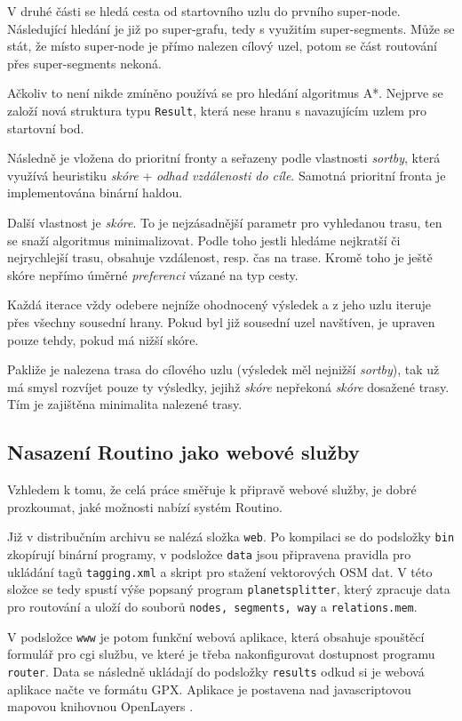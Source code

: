 \documentclass[thesis=B,czech]{FITthesis}[2012/06/26]
\begin{document}
V druhé části se hledá cesta od startovního uzlu do prvního super-node. Následující hledání je již po super-grafu, tedy s využitím super-segments.
Může se stát, že místo super-node je přímo nalezen cílový uzel, potom se část routování přes super-segments nekoná.

Ačkoliv to není nikde zmíněno používá se pro hledání algoritmus A*. Nejprve se založí nová struktura typu \verb|Result|, která nese hranu s navazujícím uzlem pro startovní bod.

Následně je vložena do prioritní fronty a seřazeny podle vlastnosti \emph{sortby}, která využívá heuristiku \emph{skóre} + \emph{odhad vzdálenosti do cíle}. Samotná prioritní fronta je implementována binární haldou.

Další vlastnost je \emph{skóre}. To je nejzásadnější parametr pro vyhledanou trasu, ten se snaží algoritmus minimalizovat. Podle toho jestli hledáme nejkratší či nejrychlejší trasu, obsahuje vzdálenost, resp. čas na trase. Kromě toho je ještě skóre nepřímo úměrné \emph{preferenci} vázané na typ cesty.

Každá iterace vždy odebere nejníže ohodnocený výsledek a z jeho uzlu iteruje přes všechny sousední hrany. Pokud byl již sousední uzel navštíven, je upraven pouze tehdy, pokud má nižší skóre.

Pakliže je nalezena trasa do cílového uzlu (výsledek měl nejnižší \emph{sortby}), tak už má smysl rozvíjet pouze ty výsledky, jejihž \emph{skóre} nepřekoná \emph{skóre} dosažené trasy. Tím je zajištěna minimalita nalezené trasy.

\subsection{Nasazení Routino jako webové služby}
Vzhledem k tomu, že celá práce směřuje k připravě webové služby, je dobré prozkoumat, jaké možnosti nabízí systém Routino. 

Již v distribučním archivu se nalézá složka \verb|web|. Po kompilaci se do podsložky \verb|bin| zkopírují binární programy, v podsložce \verb|data| jsou připravena pravidla pro ukládání tagů \verb|tagging.xml| a skript pro stažení vektorových OSM dat. V této složce se tedy spustí výše popsaný program \verb|planetsplitter|, který zpracuje data pro routování a uloží do souborů \verb|nodes, segments, way| a \verb|relations.mem|. 

V podsložce \verb|www| je potom funkční webová aplikace, která obsahuje spouštěcí formulář pro cgi službu, ve které je třeba nakonfigurovat dostupnost programu \verb|router|. Data se následně ukládají do podsložky \verb|results| odkud si je webová aplikace načte ve formátu GPX. Aplikace je postavena nad javascriptovou mapovou knihovnou OpenLayers \cite{openlayers}.
\end{document}
